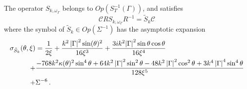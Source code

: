 \documentclass[a4paper]{article}
\begin{document}
\begin{Lem}
	\label{LemsymbolSk}
	The operator $S_{k,\omega_\Gamma}$ belongs to $\textit{Op}(S^{-1}_T(\Gamma))$, and satisfies	
	\[\mathcal{C}RS_{k,\omega_\Gamma}R^{-1} = \tilde{S}_k \mathcal{C}\]
	where the symbol of $\tilde{S}_k \in \textit{Op}(\Sigma^{-1})$ has the asymptotic expansion
	\begin{equation}
		\begin{split}
		\sigma_{\tilde{S}_k}(\theta,\xi)&=\displaystyle \frac{1}{2\xi}+\frac{k^2\left\lvert \Gamma \right\rvert^2\sin(\theta)^2}{16\xi^3}+{\frac {3i{k}^{2}{\left\lvert \Gamma \right\rvert}^{2}\sin \theta \cos \theta }{16{\xi}^{4}}}\\
		+ &\frac{-768 k^2 \kappa(\theta)^2 \sin^4\theta + 64k^2\left\lvert \Gamma \right\rvert^2 \sin^2 \theta - 48k^2\left\lvert \Gamma \right\rvert^2 \cos^2\theta + 3k^4 \left\lvert \Gamma \right\rvert^4 \sin^4\theta}{128 \xi^5}\\
		+ & \Sigma^{-6}\,.
		\end{split}
		\label{symboleSk}
	\end{equation}
\end{Lem}
\end{document}
